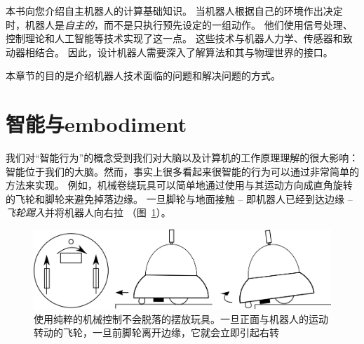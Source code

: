 本书向您介绍自主机器人的计算基础知识。 当机器人根据自己的环境作出决定时，机器人是\emph{自主的}，而不是只执行预先设定的一组动作。 他们使用信号处理、控制理论和人工智能等技术实现了这一点。 这些技术与机器人力学、传感器和致动器相结合。 因此，设计机器人需要深入了解算法和其与物理世界的接口。


本章节的目的是介绍机器人技术面临的问题和解决问题的方式。

\section{智能与embodiment}

我们对“智能行为”的概念受到我们对大脑以及计算机的工作原理理解的很大影响：智能位于我们的大脑。然而，事实上很多看起来很智能的行为可以通过非常简单的方法来实现。 例如，机械卷绕玩具可以简单地通过使用与其运动方向成直角旋转的飞轮和脚轮来避免掉落边缘。 一旦脚轮与地面接触 -- 即机器人已经到达边缘 -- \textit{飞轮踢入}并将机器人向右拉 （图~\ref{fig:winduptoy}）。

\begin{figure}
	\centering
		\includegraphics[width=\textwidth]{figs/winduptoysketch.png}
	\caption{使用纯粹的机械控制不会脱落的摆放玩具。一旦正面与机器人的运动转动的飞轮，一旦前脚轮离开边缘，它就会立即引起右转}
	\label{fig:winduptoy}
\end{figure}

